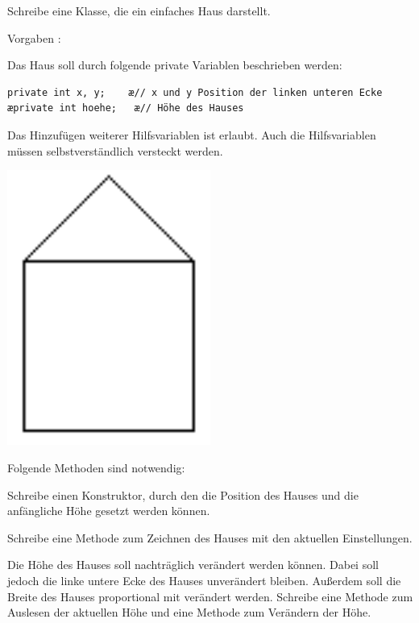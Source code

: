 \begin{compactenum}[a)]
\begin{minipage}{0.75\textwidth}
\item Schreibe eine Klasse, die ein einfaches Haus darstellt.

Vorgaben :

Das Haus soll durch folgende private Variablen beschrieben werden:

\begin{lstlisting}
private int x, y;    æ// x und y Position der linken unteren Ecke
æprivate int hoehe;   æ// Höhe des Hauses
\end{lstlisting}

Das Hinzufügen weiterer Hilfsvariablen ist erlaubt. Auch die Hilfsvariablen
müssen selbstverständlich versteckt werden.
\end{minipage}
\begin{minipage}{0.25\textwidth}
\begin{center}
\includegraphics[width=0.5\textwidth]{./inf/SEKII/12_Java_Datenkapselung/haus.png}
\end{center}
\end{minipage}

\vspace{3mm}

Folgende Methoden sind notwendig:

\begin{compactenum}[1)]
\item Schreibe einen Konstruktor, durch den die Position des Hauses und die
anfängliche Höhe gesetzt werden können.
\item Schreibe eine Methode zum Zeichnen des Hauses mit den aktuellen
Einstellungen.
\item Die Höhe des Hauses soll nachträglich verändert werden können. Dabei soll
jedoch die linke untere Ecke des Hauses unverändert bleiben. Außerdem soll die
Breite des Hauses proportional mit verändert werden. Schreibe eine Methode zum
Auslesen der aktuellen Höhe und eine Methode zum Verändern der Höhe.
\end{compactenum}


\end{compactenum}
